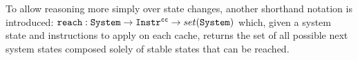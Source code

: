 \begin{definition}
   \label{def:hypreachfun}
   To allow reasoning more simply over state changes, another shorthand notation
   is introduced: $\text{\texttt{reach}}{}: \text{\texttt{System}}{} \to
   \text{\texttt{Instr}}{}^{\text{\texttt{cc}}}{} \to set(\text{\texttt{System}}{})$ which, given a system
   state and instructions to apply on each cache, returns the set of all
   possible next system states composed solely of stable states that can be
   reached.
\end{definition}
